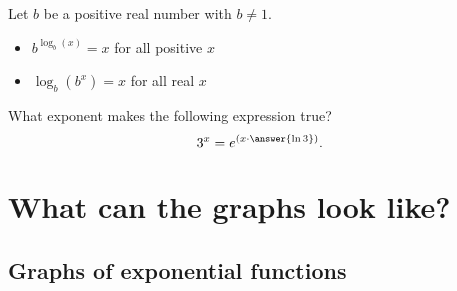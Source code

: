 \documentclass{ximera}
\begin{document}
Let $b$ be a positive real number with $b\ne 1$.
\begin{itemize}
\item $b^{\log_b(x)} = x$ for all positive $x$
\item $\log_b(b^x) = x$ for all real $x$
\end{itemize}

\begin{question}
  What exponent makes the following expression true?
  \[
  3^x = e^{\left( x \cdot \answer{\ln 3} \right)}.
  \]
\end{question}


\section{What can the graphs look like?}

\subsection{Graphs of exponential functions}
\end{document}
